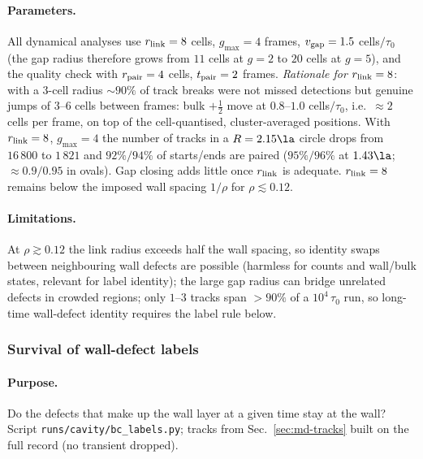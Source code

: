 \paragraph{Parameters.} All dynamical analyses use $r_{\rm link}=8$ cells, $g_{\max}=4$ frames, $v_{\rm gap}=1.5$ cells$/\tau_0$
(the gap radius therefore grows from $11$ cells at $g=2$ to $20$ cells at $g=5$), and the quality check with $r_{\rm pair}=4$ cells,
$t_{\rm pair}=2$ frames.
\emph{Rationale for $r_{\rm link}=8$}: with a $3$-cell radius $\sim90\%$ of track breaks were not missed detections but genuine jumps of
$3$--$6$ cells between frames: bulk $+\tfrac12$ move at $0.8$--$1.0$ cells$/\tau_0$, i.e.\ $\approx2$ cells per frame, on top of the
cell-quantised, cluster-averaged positions. With $r_{\rm link}=8$, $g_{\max}=4$ the number of tracks in a $R=2.15\la$ circle drops
from $16\,800$ to $1\,821$ and $92\%/94\%$ of starts/ends are paired ($95\%/96\%$ at $1.43\la$; $\approx0.9/0.95$ in ovals). Gap closing
adds little once $r_{\rm link}$ is adequate. $r_{\rm link}=8$ remains below the imposed wall spacing $1/\rho$ for $\rho\lesssim0.12$.

\paragraph{Limitations.} At $\rho\gtrsim0.12$ the link radius exceeds half the wall spacing, so identity swaps between neighbouring wall
defects are possible (harmless for counts and wall/bulk states, relevant for label identity); the large gap radius can bridge unrelated
defects in crowded regions; only $1$--$3$ tracks span $>90\%$ of a $10^4\,\tau_0$ run, so long-time wall-defect identity requires the
label rule below.

\subsubsection{Survival of wall-defect labels}
\label{sec:md-labels}

\paragraph{Purpose.} Do the defects that make up the wall layer at a given time stay at the wall? Script
\texttt{runs/cavity/bc\_labels.py}; tracks from Sec.~\ref{sec:md-tracks} built on the full record (no transient dropped).

